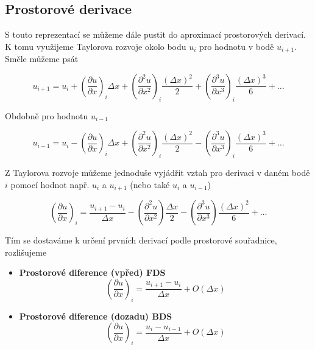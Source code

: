 \subsection*{Prostorové derivace}

S touto reprezentací se můžeme dále pustit do aproximací prostorových derivací. K 
tomu využijeme Taylorova rozvoje okolo bodu $u_i$ pro hodnotu v bodě $u_{i+1}$. 
Směle můžeme psát

\begin{equation}
u_{i+1} = u_{i} +
  \left( \frac{\partial     u}{\partial   x} \right)_{i} \Delta x
+ \left( \frac{{\partial}^2 u}{\partial x^2} \right)_{i} \frac{(\Delta x)^2}{2}
+ \left( \frac{{\partial}^3 u}{\partial x^3} \right)_{i} \frac{(\Delta x)^3}{6}
+ \dots
\label{FF}
\end{equation}

Obdobně pro hodnotu $u_{i-1}$

\begin{equation}
u_{i-1} = u_{i}
- \left( \frac{\partial     u}{\partial   x} \right)_{i} \Delta x 
+ \left( \frac{{\partial}^2 u}{\partial x^2} \right)_{i} \frac{(\Delta x)^2}{2}
- \left( \frac{{\partial}^3 u}{\partial x^3} \right)_{i}\frac{(\Delta x)^3}{6}
+ \dots
\label{FB}
\end{equation}

Z Taylorova rozvoje můžeme jednoduše vyjádřit vztah pro derivaci v daném bodě $i$ 
pomocí hodnot např. $u_{i}$ a $u_{i+1}$ (nebo také $u_{i}$ a $u_{i-1}$)

\begin{equation}
\left( \frac{\partial u}{\partial x} \right)_{i}
= \frac{u_{i+1}-u_{i}}{\Delta x}
- \left( \frac{{\partial}^2 u}{\partial x^2} \right) \frac{\Delta x}{2}
- \left( \frac{{\partial}^3 u}{\partial x^3} \right) \frac{(\Delta x)^2}{6}
+ \dots
\end{equation}

Tím se dostaváme k určení prvních derivací podle prostorové souřadnice, rozlišujeme

\begin{tcolorbox}[title=Diference I. řádu - první derivace]
\begin{itemize}
    \item{ {\bf Prostorové diference (vpřed) FDS}
\begin{equation}
  \left( \frac{\partial u}{\partial x}\right)_{i}
= \frac{u_{i+1}-u_{i}}{\Delta x}+O(\Delta x)
\label{FD}
\end{equation}}
    \item{ {\bf Prostorové diference (dozadu) BDS}
\begin{equation}
  \left( \frac{\partial u}{\partial x}\right)_{i}
= \frac{u_{i}-u_{i-1}}{\Delta x} + O(\Delta x)
\label{BD}
\end{equation}}
\end{itemize}
\end{tcolorbox}

